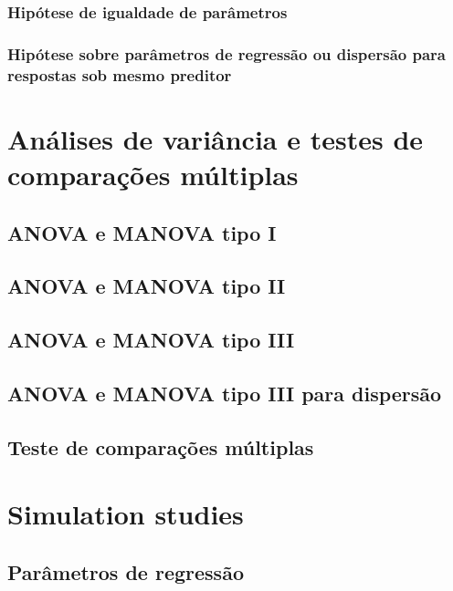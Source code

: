 \documentclass[AMA,STIX1COL]{WileyNJD-v2}
\begin{document}
\subsubsection{Hipótese de igualdade de parâmetros}

\subsubsection{Hipótese sobre parâmetros de regressão ou dispersão para respostas sob mesmo preditor}


\section{Análises de variância e testes de comparações múltiplas}\label{sec5}

\subsection{ANOVA e MANOVA tipo I}

\subsection{ANOVA e MANOVA tipo II}

\subsection{ANOVA e MANOVA tipo III}

\subsection{ANOVA e MANOVA tipo III para dispersão}

\subsection{Teste de comparações múltiplas}
  

\section{Simulation studies}\label{sec6}

\subsection{Parâmetros de regressão}
\end{document}
